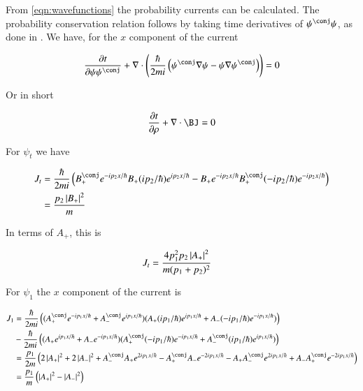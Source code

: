 \documentclass{article}
\begin{document}
From \ref{eqn:wavefunctions}
the probability currents can be calculated.  The probability
conservation relation follows by taking time derivatives of $\psi^\conj\psi$, as done in \cite{PJprobCurrent}.  We have, for the $x$ component of the current

\begin{align*}
\PD{t}{\psi\psi^\conj} + \grad \cdot \left(
\frac{\hbar}{2 m i}
\left(
\psi^\conj \grad \psi
-\psi \grad \psi^\conj
\right)
\right) = 0
\end{align*}

Or in short

\begin{align*}
\PD{t}{\rho} + \grad \cdot \BJ = 0
\end{align*}

For $\psi_t$ we have

\begin{align*}
J_t
&=
\frac{\hbar}{2 m i}
\left(
B_{+}^\conj e^{ -i p_2 x/\hbar }
B_{+} (i p_2 /\hbar)e^{ i p_2 x/\hbar }
-B_{+} e^{ -i p_2 x/\hbar }
B_{+}^\conj (-i p_2 /\hbar)e^{ -i p_2 x/\hbar }
\right) \\
&= \frac{ p_2 \Abs{ B_{+} }^2}{m } \\
\end{align*}

In terms of $A_{+}$, this is

\begin{align}\label{eqn:currentTransmitted}
J_t &= \frac{ 4 p_1^2 p_2 \left\lvert{ A_{+} }\right\rvert^2}{m (p_1 + p_2)^2}
\end{align}

For $\psi_1$ the $x$ component of the current is

\begin{align*}
J_1
&=
\frac{\hbar}{2 m i}
\left(
(A_{+}^\conj e^{ -i p_1 x/\hbar }
+A_{-}^\conj e^{ i p_1 x/\hbar })
(A_{+} (i p_1 /\hbar)e^{ i p_1 x/\hbar }
+A_{-} (-i p_1 /\hbar)e^{ -i p_1 x/\hbar })
\right)
\\
&
-
\frac{\hbar}{2 m i} \left(
(
A_{+} e^{ i p_1 x/\hbar } +A_{-} e^{ -i p_1 x/\hbar })
(A_{+}^\conj (-i p_1 /\hbar)e^{ -i p_1 x/\hbar }
+A_{-}^\conj (i p_1 /\hbar)e^{ i p_1 x/\hbar })
\right) \\
&=
\frac{p_1}{2m}
\left(
2\Abs{A_{+} }^2
+2\Abs{A_{-} }^2
+
A_{-}^\conj A_{+} e^{ 2 i p_1 x/\hbar }
-A_{+}^\conj A_{-} e^{ -2 i p_1 x/\hbar }
-A_{+} A_{-}^\conj e^{ 2 i p_1 x/\hbar }
+A_{-} A_{+}^\conj e^{ -2 i p_1 x/\hbar }
\right) \\
&=
\frac{p_1}{m}
\left(
\Abs{A_{+} }^2
-\Abs{A_{-} }^2
\right) \\
\end{align*}
\end{document}
